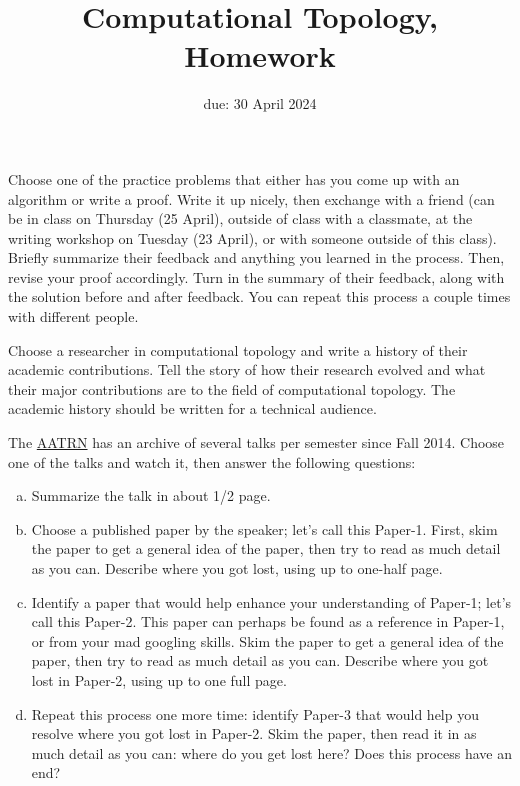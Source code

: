 \documentclass{article}
\title{Computational Topology, Homework \hwnum}
\author{\todo{your name here}}
\date{due: 30 April 2024}
\begin{document}
\maketitle



Choose one of the practice problems that either has you come up with an
algorithm or write a proof.  Write it up nicely, then exchange with a friend
(can be in class on Thursday (25 April), outside of class with a classmate, at
the writing workshop on Tuesday (23 April), or with someone outside of this
class). Briefly summarize their feedback and anything you learned in the
process.  Then, revise your proof accordingly.  Turn in the summary of their
feedback, along with the solution before and after feedback. You can repeat this
process a couple times with different people.


Choose a researcher in computational topology and write a history of their
academic contributions.  Tell the story of how their research evolved and what
their major contributions are to the field of computational topology.  The
academic history should be written for a technical audience.

The \href{https://www.aatrn.net/seminar}{AATRN} has an archive of
several talks per semester since Fall 2014.  Choose one of the talks and
watch it, then answer the following questions:
\begin{enumerate}[(a)]
    \item Summarize the talk in about 1/2 page.
    \item Choose a published paper by the speaker; let's
        call this Paper-1.  First,
        skim the paper to get a general idea of the paper, then try to
        read as much detail as you can.  Describe where you got lost,
        using up to one-half page.
    \item Identify a paper that would help enhance your understanding of
        Paper-1; let's call this Paper-2.  This paper can perhaps be
        found as a reference in Paper-1, or from your mad googling
        skills. Skim the paper to get a general idea of the paper, then try to
        read as much detail as you can.  Describe where you got lost in
        Paper-2,
        using up to one full page.
    \item Repeat this process one more time: identify Paper-3 that would
        help you resolve where you got lost in Paper-2. Skim the paper,
        then read it in as much detail as you can: where do you get lost
        here?  Does this process have an end?
\end{enumerate}
\end{document}
